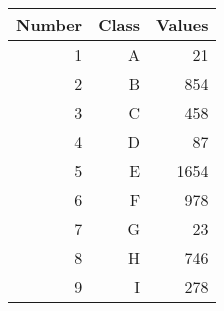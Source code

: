 \begin{tabular}{rrr}
\toprule
Number & Class & Values \\
\midrule
1     & A     & 21 \\
2     & B     & 854 \\
3     & C     & 458 \\
4     & D     & 87 \\
5     & E     & 1654 \\
6     & F     & 978 \\
7     & G     & 23 \\
8     & H     & 746 \\
9     & I     & 278 \\
\bottomrule
\end{tabular}%
